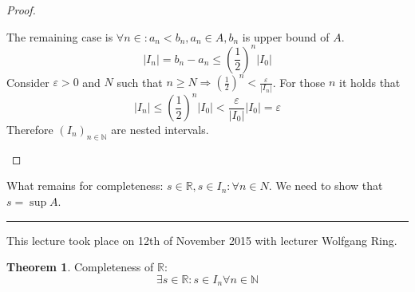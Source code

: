 \documentclass[a4paper,landscape,twocolumn]{article}
\theoremstyle{definition}
\newtheorem{theorem}{Theorem}
\newcommand\abs[1]{\left|#1\right|}
\newcommand\meta[3]{\hrule{} This #1 took place on #2 with lecturer #3.\par}
\begin{document}
\begin{proof}
\begin{description}
\begin{description}
          The remaining case is $\forall n \in \mathbb: a_n < b_n, a_n \in A, b_n$
          is upper bound of $A$.
          \[ \abs{I_n} = b_n - a_n \leq \left(\frac12\right)^n \abs{I_0} \]
          Consider $\varepsilon > 0$ and $N$ such that $n \geq N \Rightarrow
          \left(\frac12\right)^n < \frac{\varepsilon}{\abs{I_n}}$.
          For those $n$ it holds that
          \[ \abs{I_n} \leq \left(\frac12\right)^n \abs{I_0} < \frac{\varepsilon}{\abs{I_0}} \abs{I_0} = \varepsilon \]
          Therefore $(I_n)_{n \in \mathbb N}$ are nested intervals.
      \end{description}
  \end{description}
\end{proof}

What remains for completeness:
  $s \in \mathbb R, s \in I_n: \forall n \in N$.
  We need to show that $s = \sup{A}$.

\meta{lecture}{12th of November 2015}{Wolfgang Ring}

\begin{theorem}
  Completeness of $\mathbb{R}$:
  \[ \exists s \in \mathbb R: s \in I_n \forall n \in \mathbb N \]
\end{theorem}
\end{document}
